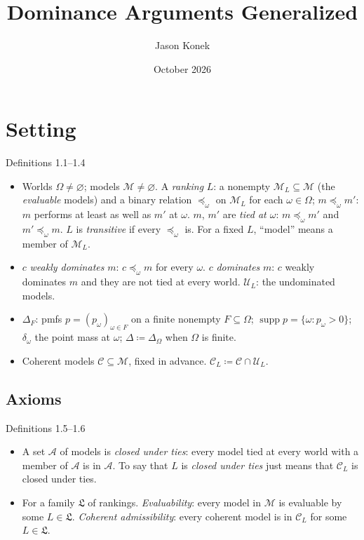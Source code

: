 \documentclass[11pt]{article}
\title{Dominance Arguments Generalized}
\author{Jason Konek}
\date{October 2026}
\newcommand{\M}{\mathcal M}
\newcommand{\C}{\mathcal C}
\newcommand{\U}{\mathcal U}
\newcommand{\Lf}{\mathfrak L}
\newcommand{\supp}{\operatorname{supp}}
\begin{document}
\maketitle



\section{Setting}

\begin{stmt}{Definitions 1.1--1.4}
\begin{itemize}[leftmargin=*]
\item Worlds $\Omega\ne\varnothing$; models $\M\ne\varnothing$. A \emph{ranking} $L$: a nonempty $\M_L\subseteq\M$ (the \emph{evaluable} models) and a binary relation $\preceq_\omega$ on $\M_L$ for each $\omega\in\Omega$; $m\preceq_\omega m'$: $m$ performs at least as well as $m'$ at $\omega$. $m$, $m'$ are \emph{tied at $\omega$}: $m\preceq_\omega m'$ and $m'\preceq_\omega m$. $L$ is \emph{transitive} if every $\preceq_\omega$ is. For a fixed $L$, ``model'' means a member of $\M_L$.
\item $c$ \emph{weakly dominates} $m$: $c\preceq_\omega m$ for every $\omega$. $c$ \emph{dominates} $m$: $c$ weakly dominates $m$ and they are not tied at every world. $\U_L$: the undominated models.
\item $\Delta_F$: pmfs $p=(p_\omega)_{\omega\in F}$ on a finite nonempty $F\subseteq\Omega$; $\supp p=\{\omega:p_\omega>0\}$; $\delta_\omega$ the point mass at $\omega$; $\Delta\coloneqq\Delta_\Omega$ when $\Omega$ is finite.
\item Coherent models $\C\subseteq\M$, fixed in advance. $\C_L\coloneqq\C\cap\U_L$.
\end{itemize}
\end{stmt}




\subsection*{Axioms}
\begin{stmt}{Definitions 1.5--1.6}
\begin{itemize}[leftmargin=*]
\item A set $\mathcal A$ of models is \emph{closed under ties}: every model tied at every world with a member of $\mathcal A$ is in $\mathcal A$. To say that $L$ is \emph{closed under ties} just means that $\C_L$ is closed under ties.
\item For a family $\Lf$ of rankings. \emph{Evaluability}: every model in $\M$ is evaluable by some $L\in\Lf$. \emph{Coherent admissibility}: every coherent model is in $\C_L$ for some $L\in\Lf$.
\end{itemize}
\end{stmt}
\end{document}
